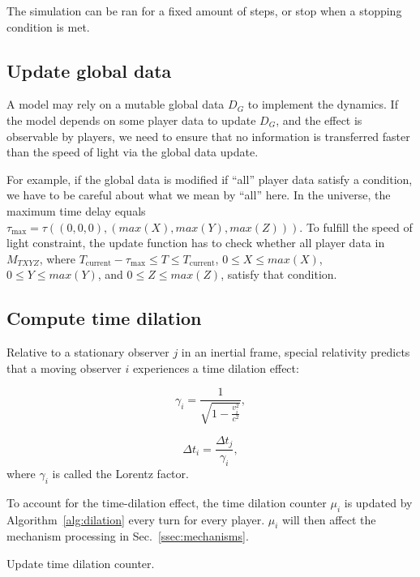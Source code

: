 \documentclass{svproc}
\begin{document}
The simulation can be ran for a fixed amount of steps, or stop when a stopping condition is met.

\subsection{Update global data} \label{ssec:global}

A model may rely on a mutable global data $D_G$ to implement the dynamics.
If the model depends on some player data to update $D_G$, 
and the effect is observable by players,
we need to ensure that no information is transferred faster than the speed of light via
the global data update.

For example, if the global data is modified if ``all'' player data satisfy a condition,
we have to be careful about what we mean by ``all'' here.
In the universe, the maximum time delay equals $\tau_{\textrm{max}} = \tau((0, 0, 0), (max(X), max(Y), max(Z)))$.
To fulfill the speed of light constraint, the update function has to check whether all player data in
$M_{TXYZ}$, where $T_{\textrm{current}} - \tau_{\textrm{max}} \leq T \leq T_{\textrm{current}}$,
$0 \leq X \leq max(X)$, $0 \leq Y \leq max(Y)$, and $0 \leq Z \leq max(Z)$,
satisfy that condition.

\subsection{Compute time dilation} \label{ssec:dilation}

Relative to a stationary observer $j$ in an inertial frame,
special relativity predicts that a moving observer $i$ experiences a time dilation effect:

\begin{equation} \label{eq:gamma}
  \gamma_i = \frac{1}{\sqrt{1 - \frac{v_i^2}{c^2}}},
\end{equation}

\begin{equation}
  \Delta t_i = \frac{\Delta t_j}{\gamma_i},
\end{equation}
where $\gamma_i$ is called the Lorentz factor.

To account for the time-dilation effect, 
the time dilation counter $\mu_i$ is updated by Algorithm~\ref{alg:dilation}
every turn for every player. 
$\mu_{i}$ will then affect the mechanism processing in Sec.~\ref{ssec:mechanisms}.

\begin{algorithm}


\caption{Update time dilation counter.}
\label{alg:dilation}
\end{algorithm}
\end{document}
